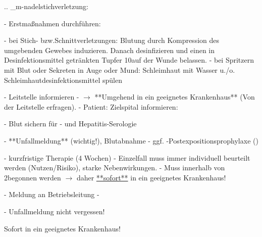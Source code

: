 
.. _m-nadelstichverletzung:


\begin{itemize}
    -   Erstmaßnahmen durchführen: \nocite{OeAG2007}
    \begin{itemize}
        -   bei Stich- bzw.Schnittverletzungen:
        Blutung durch Kompression des umgebenden
        Gewebes induzieren. Danach desinfizieren und einen
        in Desinfektionsmittel getränkten Tupfer 10\Min*
        auf der Wunde belassen.
        -   bei Spritzern mit Blut oder Sekreten in Auge oder Mund:
        Schleimhaut mit Wasser u./o. Schleimhautdesinfektionsmittel spülen
    \end{itemize}
    -   Leitstelle informieren
    -   ${\rightarrow}$ **Umgehend in ein
    geeignetes Krankenhaus** (Von der Leitstelle erfragen).
    -   Patient: Zielspital informieren:
    \begin{itemize}
        -   Blut sichern für - und Hepatitis-Serologie
    \end{itemize}
    -    **Unfallmeldung**  (wichtig!), Blutabnahme
    -   ggf. -Postexpositionsprophylaxe ()
    \begin{itemize}
        -   kurzfristige Therapie (4 Wochen)
        -   Einzelfall muss immer individuell beurteilt werden
        (Nutzen/Risiko), starke Nebenwirkungen.
        -   Muss innerhalb von 2\Hour* begonnen werden ${\rightarrow}$ daher
        \underline{**sofort**} in ein geeignetes Krankenhaus!
    \end{itemize}
    -   Meldung an Betriebsleitung
    -   
\end{itemize}

\begin{Danger}
  -   Unfallmeldung nicht vergessen!
  
  Sofort in ein geeignetes Krankenhaus!
\end{Danger}
